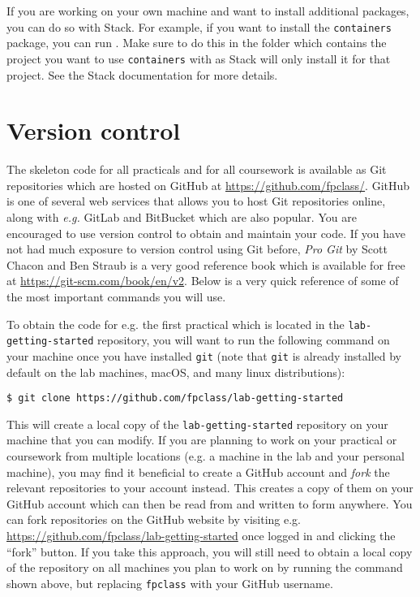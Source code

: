 If you are working on your own machine and want to install additional packages, you can do so with Stack. For example, if you want to install the \texttt{\small containers} package, you can run . Make sure to do this in the folder which contains the project you want to use \texttt{\small containers} with as Stack will only install it for that project. See the Stack documentation for more details.

\section{Version control}
\label{sec:git}

The skeleton code for all practicals and for all coursework is available as Git repositories which are hosted on GitHub at {\small \url{https://github.com/fpclass/}}. GitHub is one of several web services that allows you to host Git repositories online, along with \emph{e.g.} GitLab and BitBucket which are also popular. You are encouraged to use version control to obtain and maintain your code. If you have not had much exposure to version control using Git before, \emph{Pro Git} by Scott Chacon and Ben Straub is a very good reference book which is available for free at {\small \url{https://git-scm.com/book/en/v2}}. Below is a very quick reference of some of the most important commands you will use.

To obtain the code for e.g. the first practical which is located in the \texttt{\small lab-getting-started} repository, you will want to run the following command on your machine once you have installed \texttt{\small git} (note that \texttt{\small git} is already installed by default on the lab machines, macOS, and many linux distributions):
\begin{verbatim}
$ git clone https://github.com/fpclass/lab-getting-started
\end{verbatim}
This will create a local copy of the \texttt{\small lab-getting-started} repository on your machine that you can modify. If you are planning to work on your practical or coursework from multiple locations (e.g. a machine in the lab and your personal machine), you may find it beneficial to create a GitHub account and \emph{fork} the relevant repositories to your account instead. This creates a copy of them on your GitHub account which can then be read from and written to form anywhere. You can fork repositories on the GitHub website by visiting e.g. {\small \url{https://github.com/fpclass/lab-getting-started}} once logged in and clicking the ``fork'' button. If you take this approach, you will still need to obtain a local copy of the repository on all machines you plan to work on by running the command shown above, but replacing \texttt{\small fpclass} with your GitHub username. 


